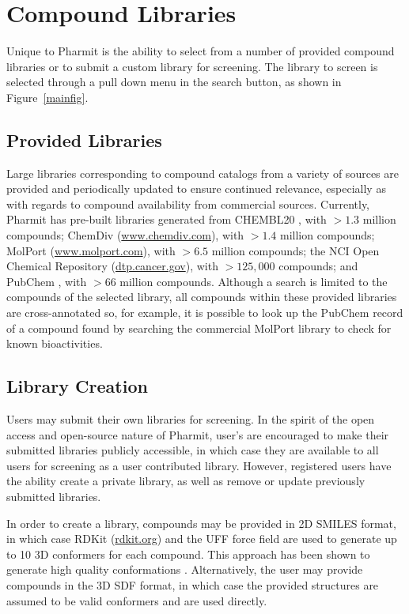 \section{Compound Libraries}

Unique to Pharmit is the ability to select from a number of provided compound libraries or to submit a custom library for screening.  The library to screen is selected through a pull down menu in the search button, as shown in Figure~\ref{mainfig}.  

\subsection{Provided Libraries}

Large libraries corresponding to compound catalogs from a variety of sources are provided and periodically updated to ensure continued relevance, especially as with regards to compound availability from commercial sources.  Currently, Pharmit has pre-built libraries generated from CHEMBL20 \cite{Gaulton_2011}, with $>1.3$ million compounds; ChemDiv (\url{www.chemdiv.com}), with $>1.4$ million compounds; MolPort (\url{www.molport.com}), with $>6.5$ million compounds; the NCI Open Chemical Repository (\url{dtp.cancer.gov}), with $>125,000$ compounds; and PubChem \cite{Kim_2015}, with $>66$ million compounds. 
 Although a search is limited to the compounds of the selected library, all compounds within these provided libraries are cross-annotated so, for example, it is possible to look up the PubChem record of a compound found by searching the commercial MolPort library to check for known bioactivities.


\subsection{Library Creation}

Users may submit their own libraries for screening.  In the spirit of the open access and open-source nature of Pharmit, user's are encouraged to make their submitted libraries publicly accessible, in which case they are available to all users for screening as a user contributed library.  However, registered users have the ability create a private library, as well as remove or update previously submitted libraries. 

In order to create a library, compounds may be provided in 2D SMILES format, in which case RDKit (\url{rdkit.org}) and the UFF force field \cite{Rappe_1992} are used to generate up to 10 3D conformers for each compound.  This approach has been shown to generate high quality conformations \cite{Ebejer_2012}.  Alternatively, the user may provide compounds in the 3D SDF format, in which case the provided structures are assumed to be valid conformers and are used directly.
